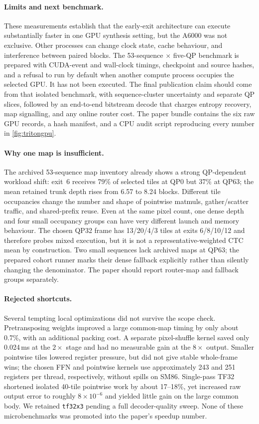 \paragraph{Limits and next benchmark.}
These measurements establish that the early-exit architecture can execute
substantially faster in one GPU synthesis setting, but the A6000 was not
exclusive. Other processes can change clock state, cache behaviour, and
interference between paired blocks. The 53-sequence $\times$ five-QP
benchmark is prepared with CUDA-event and wall-clock timings, checkpoint
and source hashes, and a refusal to run by default when another compute
process occupies the selected GPU. It has not been executed. The final
publication claim should come from that isolated benchmark, with
sequence-cluster uncertainty and separate QP slices, followed by an
end-to-end bitstream decode that charges entropy recovery, map signalling,
and any online router cost. The paper bundle contains the six raw GPU
records, a hash manifest, and a CPU audit script reproducing every number
in \cref{fig:tritongpu}.

\paragraph{Why one map is insufficient.}
The archived 53-sequence map inventory already shows a strong QP-dependent
workload shift: exit~6 receives 79\% of selected tiles at QP0 but 37\% at
QP63; the mean retained trunk depth rises from 6.57 to 8.24 blocks.
Different tile occupancies change the number and shape of pointwise
matmuls, gather/scatter traffic, and shared-prefix reuse. Even at the
same pixel count, one dense depth and four small occupancy groups can have
very different launch and memory behaviour. The chosen QP32 frame has
13/20/4/3 tiles at exits 6/8/10/12 and therefore probes mixed execution,
but it is not a representative-weighted CTC mean by construction. Two
small sequences lack archived maps at QP63; the prepared cohort runner
marks their dense fallback explicitly rather than silently changing the
denominator. The paper should report router-map and fallback groups
separately.

\paragraph{Rejected shortcuts.}
Several tempting local optimizations did not survive the scope check.
Pretransposing weights improved a large common-map timing by only about
0.7\%, with an additional packing cost. A separate pixel-shuffle kernel
saved only 0.024\,ms at the $2\times$ stage and had no measurable gain at
the $8\times$ output. Smaller pointwise tiles lowered register pressure,
but did not give stable whole-frame wins; the chosen FFN and pointwise
kernels use approximately 243 and 251 registers per thread, respectively,
without spills on SM86. Single-pass TF32 shortened isolated 40-tile
pointwise work by about 17--18\%, yet increased raw output error to roughly
$8\times10^{-6}$ and yielded little gain on the large common body. We
retained \texttt{tf32x3} pending a full decoder-quality sweep. None of
these microbenchmarks was promoted into the paper's speedup number.

